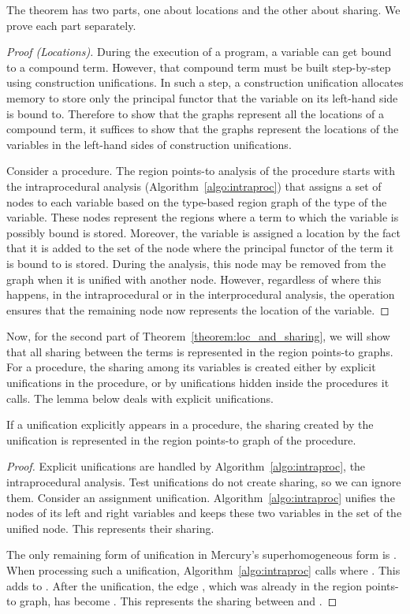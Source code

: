 \documentclass{tlp}
\begin{document}
The theorem has two parts, one about locations and the other about sharing.
We prove each part separately.
\begin{proof}[Proof (Locations)]
During the execution of a program,
a variable can get bound to a compound term.
However, that compound term must be built step-by-step
using construction unifications.
In such a step, a construction unification allocates memory
to store only the principal functor that
the variable on its left-hand side is bound to.
Therefore to show that the graphs represent
all the locations of a compound term,
it suffices to show that the graphs represent the locations
of the variables in the left-hand sides of construction unifications.

Consider a procedure.
The region points-to analysis of the procedure starts with
the intraprocedural analysis (Algorithm~\ref{algo:intraproc}) that
assigns a set of nodes to each variable based on
the type-based region graph of the type of the variable.
These nodes represent the regions where
a term to which the variable is possibly bound is stored.
Moreover, the variable is assigned a location by the fact that
it is added to the  set of the node
where the principal functor of the term it is bound to is stored.
During the analysis, this node may be removed from the graph
when it is unified with another node.
However, regardless of where this happens,
in the intraprocedural or in the interprocedural analysis,
the  operation ensures that
the remaining node now represents the location of the variable.
\end{proof}

Now, for the second part of Theorem~\ref{theorem:loc_and_sharing},
we will show that
all sharing between the terms is represented in the region points-to graphs.
For a procedure, the sharing among its variables is created
either by explicit unifications in the procedure,
or by unifications hidden inside the procedures it calls.
The lemma below deals with explicit unifications.

\begin{lemma}
\label{lemma:sharing_unifs}
    If a unification explicitly appears in a procedure,
    the sharing created by the unification
    is represented in the region points-to graph of the procedure.
\end{lemma}
\begin{proof}
Explicit unifications are handled by Algorithm~\ref{algo:intraproc},
the intraprocedural analysis.
Test unifications do not create sharing, so we can ignore them.
Consider an assignment unification.
Algorithm~\ref{algo:intraproc} unifies
the nodes of its left and right variables and keeps
these two variables in the  set of the unified node.
This represents their sharing.

The only remaining form of unification in Mercury's superhomogeneous form
is .
When processing such a unification,
Algorithm~\ref{algo:intraproc} calls 
where .
This adds  to .
After the unification, the edge ,
which was already in the region points-to graph,
has become .
This represents the sharing between  and .
\end{proof}
\end{document}
